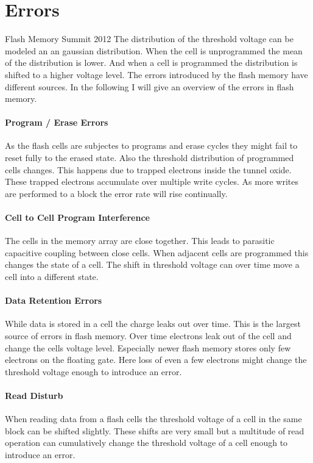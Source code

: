 \section{Errors}Flash Memory Summit 2012
The distribution of the threshold voltage can be modeled an an gaussian distribution\cite{ZaTu16}. When the cell is unprogrammed the mean of the distribution is lower. And when a cell is programmed the distribution is shifted to a higher voltage level. The errors introduced by the flash memory have different sources. In the following I will give an overview of the errors in flash memory.
\paragraph{Program / Erase Errors}
As the flash cells are subjectes to programs and erase cycles they might fail to reset fully to the erased state. Also the threshold distribution of programmed cells changes. This happens due to trapped electrons inside the tunnel oxide. These trapped electrons accumulate over multiple write cycles. As more writes are performed to a block the error rate will rise continually.
\paragraph{Cell to Cell Program Interference}
The cells in the memory array are close together. This leads to parasitic capacitive coupling between close cells. When adjacent cells are programmed this changes the state of a cell. The shift in threshold voltage can over time move a cell into a different state.
\paragraph{Data Retention Errors}
While data is stored in a cell the charge leaks out over time. This is the largest source of errors in flash memory. Over time electrons leak out of the cell and change the cells voltage level. Especially newer flash memory stores only few electrons on the floating gate. Here loss of even a few electrons might change the threshold voltage enough to introduce an error\cite{YoGa12}.
\paragraph{Read Disturb}
When reading data from a flash cells the threshold voltage of a cell in the same block can be shifted slightly. These shifts are very small but a multitude of read operation can cumulatively change the threshold voltage of a cell enough to introduce an error.
\cite{CaGh17}